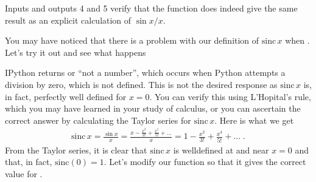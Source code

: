 \documentclass[letterpaper,10pt,english]{sphinxmanual}
\begin{document}
\sphinxAtStartPar
Inputs and outputs 4 and 5 verify that the function does indeed give the same result as an explicit calculation of \(\sin x/x\).

\sphinxAtStartPar
You may have noticed that there is a problem with our definition of \(\mathrm{sinc}\,x\) when .  Let’s try it out and see what happens

\begin{sphinxVerbatim}[commandchars=\\\{\}]
\end{sphinxVerbatim}

\sphinxAtStartPar
IPython returns  or “not a number”, which occurs when Python attempts a division by zero, which is not defined.  This is not the desired response as \(\mathrm{sinc}\,x\) is, in fact, perfectly well defined for \(x=0\).  You can verify this using L’Hopital’s rule, which you may have learned in your study of calculus, or you can ascertain the correct answer by calculating the Taylor series for \(\mathrm{sinc}\,x\).  Here is what we get
\begin{equation*}
\begin{split}\mathrm{sinc}\,x = \frac{\sin x}{x}
                = \frac{x - \frac{x^3}{3!} + \frac{x^5}{5!} + ...}{x}
                = 1 - \frac{x^2}{3!} + \frac{x^4}{5!} + ... \;.\end{split}
\end{equation*}
\sphinxAtStartPar
From the Taylor series, it is clear that \(\mathrm{sinc}\,x\) is well\sphinxhyphen{}defined at and near \(x=0\) and that, in fact,  \(\mathrm{sinc}(0)=1\).  Let’s modify our function so that it gives the correct value for .

\begin{sphinxVerbatim}[commandchars=\\\{\},numbers=left,firstnumber=1,stepnumber=1]
 
      
           
     
           
      


\end{sphinxVerbatim}
\end{document}
